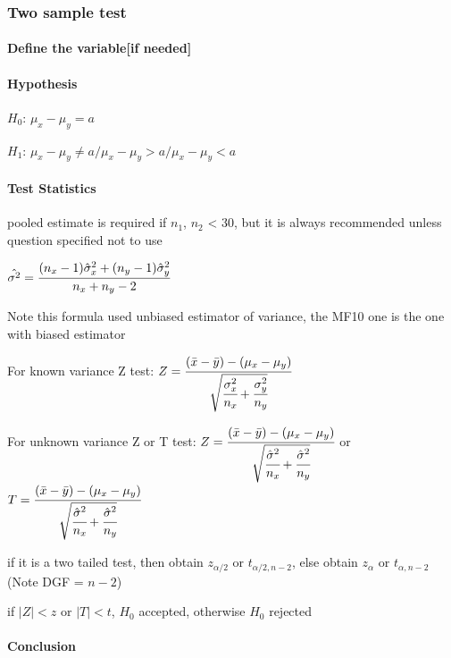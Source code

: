 \documentclass[]{article}
\let\oldparagraph\paragraph
\renewcommand{\paragraph}[1]{\oldparagraph{#1}\mbox{}}
\begin{document}
\subsubsection{Two sample test}\label{header-n139}

\paragraph{Define the variable{[}if needed{]}}\label{header-n140}

\paragraph{Hypothesis}\label{header-n141}

\(H_0\): \(\mu_x - \mu_y = a\)

\(H_1\): \(\mu_x - \mu_y \ne a /\mu_x - \mu_y> a /\mu_x - \mu_y < a\)

\paragraph{Test Statistics}\label{header-n144}

pooled estimate is required if \(n_1\), \(n_2\) \textless{} 30, but it
is always recommended unless question specified not to use

\(\hat{\sigma^2} = \cfrac{(n_x-1)\hat{\sigma}^2_x + (n_y-1)\hat{\sigma}^2_y}{n_x + n_y -2}\)

Note this formula used unbiased estimator of variance, the MF10 one is
the one with biased estimator

For known variance Z test:
\(Z = \cfrac{(\bar{x} - \bar{y}) - (\mu_x - \mu_y)}{\sqrt{\cfrac{{\sigma}^2_x}{n_x} + \cfrac{{\sigma}^2_y}{n_y}}}\)

For unknown variance Z or T test:
\(Z = \cfrac{(\bar{x} - \bar{y}) - (\mu_x - \mu_y)}{\sqrt{\cfrac{\hat{\sigma}^2}{n_x} + \cfrac{\hat{\sigma}^2}{n_y}}}\)
or
\(T =\cfrac{(\bar{x} - \bar{y}) - (\mu_x - \mu_y)}{\sqrt{\cfrac{\hat{\sigma}^2}{n_x} + \cfrac{\hat{\sigma}^2}{n_y}}}\)

if it is a two tailed test, then obtain \(z_{\alpha/2}\) or
\(t_{\alpha/2 , n-2}\), else obtain \(z_{\alpha}\) or
\(t_{\alpha, n-2}\)(Note DGF = \(n-2\))

if \(|Z| < z\) or \(|T| < t\), \(H_0\) accepted, otherwise \(H_0\)
rejected

\paragraph{Conclusion}\label{header-n152}
\end{document}
